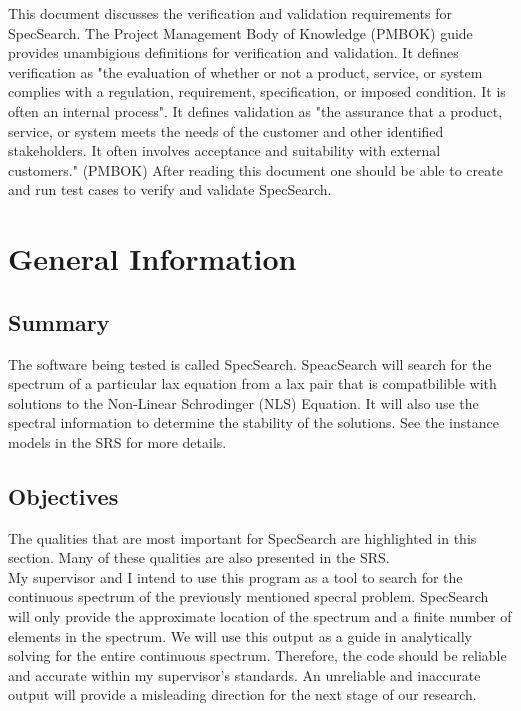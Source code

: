 \documentclass[12pt, titlepage]{article}
\begin{document}
This document discusses the verification and validation requirements for 
SpecSearch. The Project Management Body of Knowledge (PMBOK) guide provides 
unambigious definitions for verification and validation. It defines 
verification as "the evaluation of whether or not a product, service, or system 
complies with a regulation, requirement, specification, or imposed condition. 
It is often an internal process". It defines validation as "the assurance that 
a product, service, or system meets the needs of the customer and other 
identified stakeholders. It often involves acceptance and suitability with 
external customers." (PMBOK) After reading this document one should be able to 
create and run test cases to verify and validate SpecSearch. 

\section{General Information}

\subsection{Summary}

The software being tested is called SpecSearch. SpeacSearch will search for the 
spectrum of a particular lax equation from a lax pair that is compatbilible 
with solutions to the Non-Linear Schrodinger (NLS) Equation. It will also use 
the spectral information to determine the stability of the solutions. See the 
instance models in the SRS for more details.
\subsection{Objectives}

	The qualities that are most important for SpecSearch are highlighted in 
	this section. Many of these qualities are also presented in the SRS. \\
	
	My supervisor and I intend to use this program as a tool to search for the 
	continuous spectrum of the previously mentioned specral problem. SpecSearch 
	will only provide the approximate 
	location of the spectrum and a finite number of elements in the spectrum. 
	We will 
	use this output as a guide in analytically solving for the 
	entire continuous spectrum.  Therefore, the 
	code should be reliable and accurate within my supervisor's standards. An 
	unreliable and inaccurate output will provide a misleading direction for 
	the next stage of our research. \\ 
	
\end{document}
